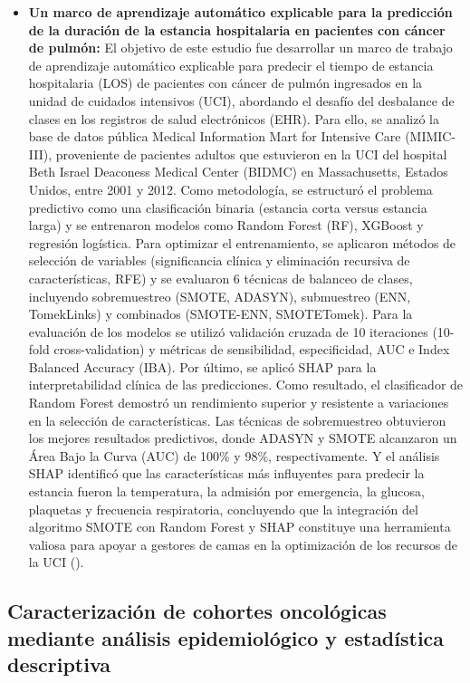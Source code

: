 \begin{itemize}
    \item \textbf{Un marco de aprendizaje automático explicable para la predicción de la duración de la estancia hospitalaria en pacientes con cáncer de pulmón:} El objetivo de este estudio fue desarrollar un marco de trabajo de aprendizaje automático explicable para predecir el tiempo de estancia hospitalaria (LOS) de pacientes con cáncer de pulmón ingresados en la unidad de cuidados intensivos (UCI), abordando el desafío del desbalance de clases en los registros de salud electrónicos (EHR). Para ello, se analizó la base de datos pública Medical Information Mart for Intensive Care (MIMIC-III), proveniente de pacientes adultos que estuvieron en la UCI del hospital Beth Israel Deaconess Medical Center (BIDMC) en Massachusetts, Estados Unidos, entre 2001 y 2012. Como metodología, se estructuró el problema predictivo como una clasificación binaria (estancia corta versus estancia larga) y se entrenaron modelos como Random Forest (RF), XGBoost y regresión logística. Para optimizar el entrenamiento, se aplicaron métodos de selección de variables (significancia clínica y eliminación recursiva de características, RFE) y se evaluaron 6 técnicas de balanceo de clases, incluyendo sobremuestreo (SMOTE, ADASYN), submuestreo (ENN, TomekLinks) y combinados (SMOTE-ENN, SMOTETomek). Para la evaluación de los modelos se utilizó validación cruzada de 10 iteraciones (10-fold cross-validation) y métricas de sensibilidad, especificidad, AUC e Index Balanced Accuracy (IBA). Por último, se aplicó SHAP para la interpretabilidad clínica de las predicciones. Como resultado, el clasificador de Random Forest demostró un rendimiento superior y resistente a variaciones en la selección de características. Las técnicas de sobremuestreo obtuvieron los mejores resultados predictivos, donde ADASYN y SMOTE alcanzaron un Área Bajo la Curva (AUC) de 100\% y 98\%, respectivamente. Y el análisis SHAP identificó que las características más influyentes para predecir la estancia fueron la temperatura, la admisión por emergencia, la glucosa, plaquetas y frecuencia respiratoria, concluyendo que la integración del algoritmo SMOTE con Random Forest y SHAP constituye una herramienta valiosa para apoyar a gestores de camas en la optimización de los recursos de la UCI (\cite{article16}). 
\end{itemize}




\subsection{Caracterización de cohortes oncológicas mediante análisis epidemiológico y estadística descriptiva}

